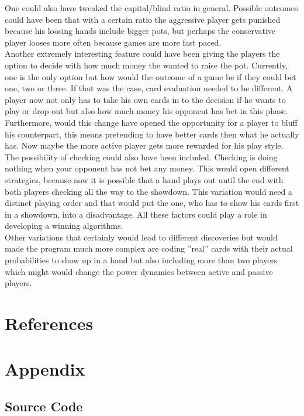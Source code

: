 \documentclass[11pt]{article}
\begin{document}
One could also have tweaked the capital/blind ratio in general. Possible outcomes could have been that with a certain ratio the aggressive player gets punished because his loosing hands include bigger pots, but perhaps the conservative player looses more often because games are more fast paced.\\

Another extremely interesting feature could have been giving the players the option to decide with how much money the wanted to raise the pot. Currently, one is the only option but how would the outcome of a game be if they could bet one, two or three. If that was the case, card evaluation needed to be different. A player now not only has to take his own cards in to the decision if he wants to play or drop out but also how much money his opponent has bet in this phase. Furthermore, would this change have opened the opportunity for a player to bluff his counterpart, this means pretending to have better cards then what he actually has. Now maybe the more active player gets more rewarded for his play style.\\

The possibility of checking could also have been included. Checking is doing nothing when your opponent has not bet any money. This would open different strategies, because now it is possible that a hand plays out until the end with both players checking all the way to the showdown. This variation would need a distinct playing order and that would put the one, who has to show his cards first in a showdown, into a disadvantage. All these factors could play a role in developing a winning algorithms.\\

Other variations that certainly would lead to different discoveries but would made the program much more complex are coding ''real'' cards with their actual probabilities to show up in a hand but also including more than two players which might would change the power dynamics between active and passive players.


\section{References}

\section{Appendix}
\subsection{Source Code}
\end{document}
